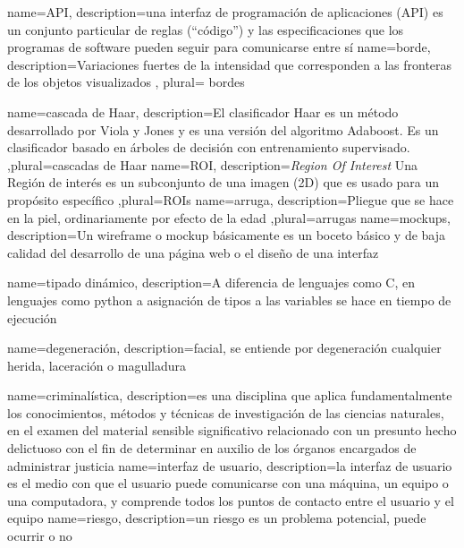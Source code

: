 

{
	name=API,
	description={una interfaz de programación de aplicaciones (API) es un conjunto particular de reglas (``código'') y las especificaciones que los programas de software pueden seguir para comunicarse entre sí} 
}
{
	name=borde,
	description={Variaciones fuertes de la intensidad que	corresponden a las fronteras de los objetos visualizados} , plural= bordes
}


{
	name=cascada de Haar,
	description={El clasificador Haar es un método desarrollado por Viola y Jones y es una versión del algoritmo Adaboost. Es un clasificador basado en árboles de decisión con entrenamiento supervisado.} ,plural=cascadas de Haar
}
{
	name=ROI,
	description={\textit{Region Of Interest} Una Región de interés es un subconjunto de una imagen (\gls{2D}) que es usado para un propósito específico} ,plural=ROIs
}
{
	name=arruga,
	description={Pliegue que se hace en la piel, ordinariamente por efecto de la edad} ,plural=arrugas
}
{
	name=mockups,
	description={Un wireframe o mockup básicamente es un boceto básico y de baja calidad del desarrollo de una página web o el diseño de una interfaz} 
}

{
	name=tipado dinámico,
	description={A diferencia de lenguajes como C, en lenguajes como \gls{python} a asignación de tipos a las variables se hace en tiempo de ejecución} 
}



{
	name=degeneración,
	description={facial, se entiende por degeneración cualquier herida, laceración o magulladura} 
}


{
	name=criminalística,
	description={es una disciplina que aplica fundamentalmente los conocimientos, métodos y técnicas de investigación de las ciencias naturales, en el examen del material sensible significativo relacionado con un presunto hecho delictuoso con el fin de determinar en auxilio de los órganos encargados de administrar justicia} 
}
{
	name=interfaz de usuario,
	description={la interfaz de usuario es el medio con que el usuario puede comunicarse con una máquina, un equipo o una computadora, y comprende todos los puntos de contacto entre el usuario y el equipo} 
}
{
	name=riesgo,
	description={un riesgo es un problema potencial, puede ocurrir o no} 
}

